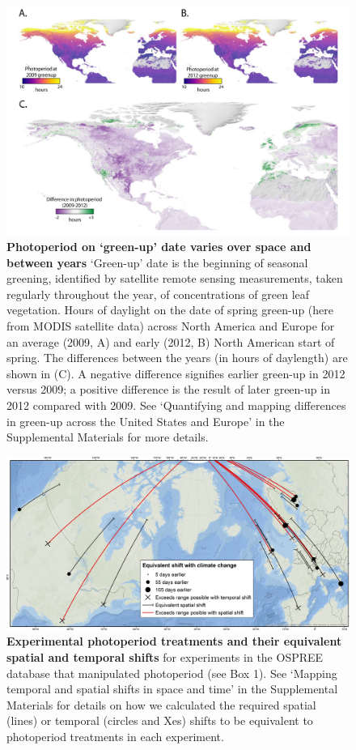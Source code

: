 \documentclass{article}
\begin{document}
 \begin{figure}[h]
\centering
\includegraphics{..//..//docs/photoperiod/figures/Greenup_corr_sm_leg.pdf} %
\caption{\textbf{Photoperiod on `green-up' date varies over space and between years} `Green-up' date is the beginning of seasonal greening, identified by satellite remote sensing measurements, taken regularly throughout the year, of concentrations of green leaf vegetation. Hours of daylight on the date of spring green-up (here from MODIS satellite data) across North America and Europe for an average (2009, A) and early (2012, B) North American start of spring. The differences between the years (in hours of daylength) are shown in (C). A negative difference signifies earlier green-up in 2012 versus 2009; a positive difference is the result of later green-up in 2012 compared with 2009. See `Quantifying and mapping differences in green-up across the United States and Europe' in the Supplemental Materials for more details. }%
 \label{fig:greenup}%
 \end{figure}

\begin{figure}[h]
\centering
\includegraphics{..//..//analyses/photoperiod/figures/ospree_photopmap_fromblake.jpg} 
\caption{\textbf{Experimental photoperiod treatments and their equivalent spatial and temporal shifts} for experiments in the OSPREE database that manipulated photoperiod (see Box 1). See `Mapping temporal and spatial shifts in space and time' in the Supplemental Materials for details on how we calculated the required spatial (lines) or temporal (circles and Xes) shifts to be equivalent to photoperiod treatments in each experiment.}
 \label{fig:photomap}
 \end{figure}
\end{document}
